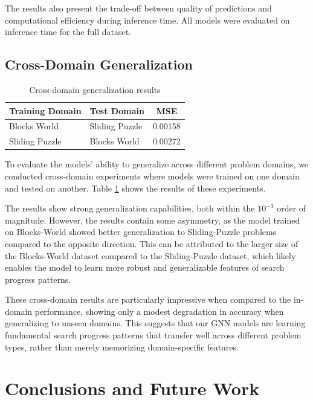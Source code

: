 \documentclass[letterpaper]{article}
\newcommand{\naomi}[1]{{\color{magenta}{Naomi: #1}}}
\begin{document}
The results also present the trade-off between quality of predictions and computational efficiency during inference time. All models were evaluated on inference time for the full dataset. \naomi{expand...}


\subsection{Cross-Domain Generalization}

\begin{table}
    \centering
    \caption{Cross-domain generalization results}
    \label{tab:cross_domain}
    \begin{tabular}{|l|l|c|}
    \hline
    \textbf{Training Domain} & \textbf{Test Domain} & \textbf{MSE} \\
    \hline
    Blocks World & Sliding Puzzle & 0.00158 \\
    Sliding Puzzle & Blocks World & 0.00272 \\
    \hline
    \end{tabular}
\end{table}

To evaluate the models' ability to generalize across different problem domains, we conducted cross-domain experiments where models were trained on one domain and tested on another. Table \ref{tab:cross_domain} shows the results of these experiments.

The results show strong generalization capabilities, both within the $10^{-3}$ order of magnitude. 
However, the results contain some asymmetry, as the model trained on Blocks-World showed better generalization to Sliding-Puzzle problems compared to the opposite direction. This can be attributed to the larger size of the Blocks-World dataset compared to the Sliding-Puzzle dataset, which likely enables the model to learn more robust and generalizable features of search progress patterns.

These cross-domain results are particularly impressive when compared to the in-domain performance, showing only a modest degradation in accuracy when generalizing to unseen domains. This suggests that our GNN models are learning fundamental search progress patterns that transfer well across different problem types, rather than merely memorizing domain-specific features.

\section{Conclusions and Future Work}
\end{document}
